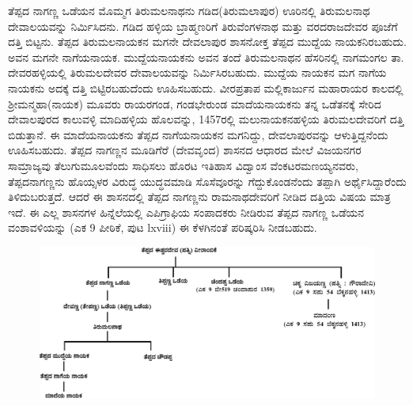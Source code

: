 ತೆಪ್ಪದ ನಾಗಣ್ಣ ಒಡೆಯನ ಮೊಮ್ಮಗ ತಿರುಮಲನಾಥನು ಗಡಿದ(ತಿರುಮಲಾಪುರ) ಊರಿನಲ್ಲಿ ತಿರುಮಲನಾಥ ದೇವಾಲಯ\-ವನ್ನು ನಿರ್ಮಿಸಿದನು. ಗಡಿದ ಹಳ್ಳಿಯ ಬ್ರಾಹ್ಮಣರಿಗೆ ತಿರುವೆಂಗಳನಾಥ ಮತ್ತು ವರದರಾಜದೇವರ ಪೂಜೆಗೆ ದತ್ತಿ ಬಿಟ್ಟನು. ತೆಪ್ಪದ ತಿರುಮಲನಾಯಕನ ಮಗನೇ ದೇವಲಾಪುರ ಶಾಸನೋಕ್ತ ತೆಪ್ಪದ ಮುದ್ದೆಯ ನಾಯಕನಿರಬಹುದು. ಅವನ ಮಗನೇ ನಾಗೆಯನಾಯಕ. ಮುದ್ದೆಯನಾಯಕನು ಅವನ ತಂದೆ ತಿರುಮಲನಾಥನ ಹೆಸರಿನಲ್ಲಿ ನಾಗಮಂಗಲ ತಾ. ದೇವರಹಳ್ಳಿಯಲ್ಲಿ ತಿರುಮಲದೇವರ ದೇವಾಲಯವನ್ನು ನಿರ್ಮಿಸಿರಬಹುದು. ಮುದ್ದೆಯ ನಾಯಕನ ಮಗ ನಾಗೆಯ ನಾಯಕನು ಅದಕ್ಕೆ ದತ್ತಿ ಬಿಟ್ಟಿರಬಹುದೆಂದು ಊಹಿಸಬಹುದು. ವೀರಪ್ರತಾಪ ಮಲ್ಲಿಕಾರ್ಜುನ ಮಹಾರಾಯರ ಕಾಲದಲ್ಲಿ ಶ‍್ರೀಮನ್ಮಹಾ(ನಾಯಕ) ಮೂವರು ರಾಯರಗಂಡ, ಗಂಡಭೇರುಂಡ ಮಾದೆಯನಾಯಕನು ತನ್ನ ಒಡೆತನಕ್ಕೆ ಸೇರಿದ ದೇವಾಲಪುರದ ಕಾಲುವಳ್ಳಿ ಮಾದಿಹಳ್ಳಿಯ ಹೊಲವನ್ನು, 1457ರಲ್ಲಿ ಮಲುನಾಯಕನಹಳ್ಳಿಯ ತಿರುಮಲದೇವರಿಗೆ ದತ್ತಿ ಬಿಡುತ್ತಾನೆ. ಈ ಮಾದೆಯನಾಯಕನು ತೆಪ್ಪದ ನಾಗೆಯನಾಯಕನ ಮಗನಿದ್ದು, ದೇವಲಾಪುರವನ್ನು ಆಳುತ್ತಿದ್ದನೆಂದು ಊಹಿಸಬಹುದು. ತೆಪ್ಪದ ನಾಗಣ್ಣನ ಮೂಡಿಗೆರೆ (ದೇವವೃಂದ) ಶಾಸನದ ಆಧಾರದ ಮೇಲೆ ವಿಜಯನಗರ ಸಾಮ್ರಾಜ್ಯವು ತೆಲುಗುಮೂಲವೆಂದು ಸಾಧಿಸಲು ಹೊರಟ ಇತಿಹಾಸ ವಿದ್ವಾಂಸ ವೆಂಕಟರಮಣಯ್ಯನವರು, ತೆಪ್ಪದನಾಗಣ್ಣನು ಹೊಯ್ಸಳರ ವಿರುದ್ಧ ಯುದ್ಧವಮಾಡಿ ಸೊಸೆವೂರನ್ನು ಗೆದ್ದುಕೊಂಡನೆಂದು ತಪ್ಪಾಗಿ ಅರ್ಥೈಸಿದ್ದಾರೆಂದು ತಿಳಿದುಬರುತ್ತದೆ. ಆದರೆ ಈ ಶಾಸನದಲ್ಲಿ ತೆಪ್ಪದ ನಾಗಣ್ಣನು ರಾಮನಾಥದೇವರಿಗೆ ನೀಡಿದ ದತ್ತಿಯ ವಿಷಯ ಮಾತ್ರ ಇದೆ. ಈ ಎಲ್ಲ ಶಾಸನಗಳ ಹಿನ್ನೆಲೆಯಲ್ಲಿ ಎಪಿಗ್ರಾಫಿಯ ಸಂಪಾದಕರು ನೀಡಿರುವ ತೆಪ್ಪದ ನಾಗಣ್ಣ ಒಡೆಯನ ವಂಶಾವಳಿಯನ್ನು (ಎಕ 9 ಪೀಠಿಕೆ, ಪುಟ lxviii) ಈ ಕೆಳಗಿನಂತೆ ಪರಿಷ್ಕರಿಸಿ ನೀಡಬಹುದು.

\begin{figure}[H]
\includegraphics[scale=1.03]{images/chap3/chap3fig44.jpeg}
\end{figure}

\newpage

